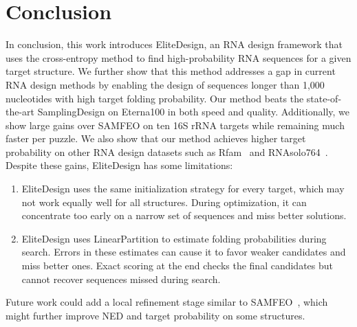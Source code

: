 \section{\textcolor{titleblue}{Conclusion}}
In conclusion, this work introduces EliteDesign, an RNA design framework that uses the
cross-entropy method to find high-probability RNA sequences for a given target structure.
We further show that this method addresses a gap in current RNA design
methods by enabling the design of sequences longer than 1,000 nucleotides with high
target folding probability. Our method beats the state-of-the-art SamplingDesign on Eterna100 in both
speed and quality. Additionally, we show large gains over SAMFEO on ten 16S
rRNA targets while remaining much faster per puzzle. We also show that our
method achieves higher target probability on other RNA design datasets such as Rfam~\citep{kalvari2021}
and RNAsolo764~\citep{adamczyk2022}. Despite these gains, EliteDesign has some limitations:
\begin{enumerate}
\item EliteDesign uses the same initialization strategy for every target, which may not work
  equally well for all structures. During optimization, it can concentrate too early on
  a narrow set of sequences and miss better solutions.
\item EliteDesign uses LinearPartition to estimate folding probabilities during search. Errors in these estimates
  can cause it to favor weaker candidates and miss better ones.
  Exact scoring at the end checks the final candidates but cannot recover sequences
  missed during search.
\end{enumerate}
Future work could add a local refinement stage similar to SAMFEO~\citep{zhou2023},
which might further improve NED and target probability on some structures.
